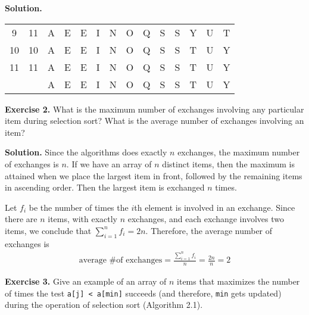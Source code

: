 \documentclass[12pt, a4paper]{article}
\newenvironment{ex}[2][Exercise]
{\par\medskip\noindent \textbf{#1 #2.}}
{\medskip}
\newenvironment{sol}[1][Solution]
{\par\medskip\noindent \textbf{#1.} }
{\medskip}
\begin{document}
\begin{sol}
\begin{center}
\begin{tabular}{cc|cccccccccccc}
				9 & 11 & {\color{gray} A} & {\color{gray} E} & {\color{gray} E} & {\color{gray}I} & {\color{gray} N} & {\color{gray}O} & {\color{gray}Q} & {\color{gray}S} & {\color{gray}S} & Y & U & {\color{red}T}\\
				
				10 & 10 & {\color{gray} A} & {\color{gray} E} & {\color{gray} E} & {\color{gray}I} & {\color{gray} N} & {\color{gray}O} & {\color{gray}Q} & {\color{gray}S} & {\color{gray}S} & {\color{gray}T} & {\color{red}U} & Y\\
				
				11 & 11 & {\color{gray} A} & {\color{gray} E} & {\color{gray} E} & {\color{gray}I} & {\color{gray} N} & {\color{gray}O} & {\color{gray}Q} & {\color{gray}S} & {\color{gray}S} & {\color{gray}T} & {\color{gray}U} & {\color{red}Y}\\
				
				{} & {} & A & E & E & I & N & O & Q & S & S & T & U & Y\\
			\end{tabular}
		\end{center}
	\end{sol}
	\begin{ex}{2}
		What is the maximum number of exchanges involving any particular item during selection sort?
		What is the average number of exchanges involving an item?
	\end{ex}
	\begin{sol}
		Since the algorithms does exactly $n$ exchanges, the maximum number of exchanges is $n$.
		If we have an array of $n$ distinct items, then the maximum is attained when we place the
		largest item in front, followed by the remaining items in ascending order. Then the largest
		item is exchanged $n$ times.
		
		Let $f_i$ be the number of times the $i$th element is involved in an exchange. Since there
		are $n$ items, with exactly $n$ exchanges, and each exchange involves two items, we conclude
		that $\sum_{i=1}^{n}f_i = 2n$. Therefore, the average number of exchanges is
		\begin{align*}
			\text{average \# of exchanges} = \frac{\sum_{i=1}^{n}f_i}{n} = \frac{2n}{n}=2
		\end{align*}
	\end{sol}
	\begin{ex}{3}
		Give  an example of an array of $n$ items that maximizes the number of times
		the test \texttt{a[j] < a[min]} succeeds (and therefore, \texttt{min} gets updated)
		during the operation of selection sort (Algorithm 2.1).
	\end{ex}
\end{document}
